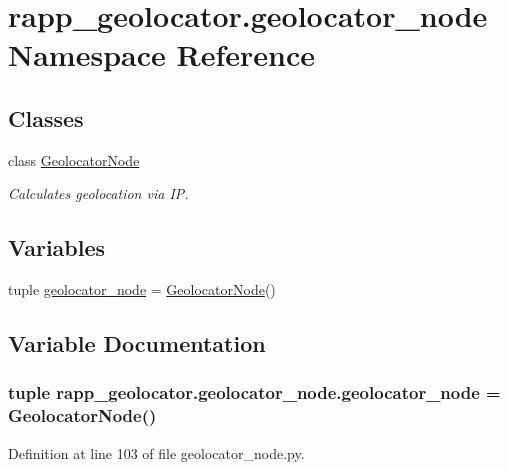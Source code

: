\hypertarget{namespacerapp__geolocator_1_1geolocator__node}{\section{rapp\-\_\-geolocator.\-geolocator\-\_\-node Namespace Reference}
\label{namespacerapp__geolocator_1_1geolocator__node}
}
\subsection*{Classes}
\begin{DoxyCompactItemize}
\item 
class \hyperlink{classrapp__geolocator_1_1geolocator__node_1_1GeolocatorNode}{Geolocator\-Node}
\begin{DoxyCompactList}\small\item\em Calculates geolocation via I\-P. \end{DoxyCompactList}\end{DoxyCompactItemize}
\subsection*{Variables}
\begin{DoxyCompactItemize}
\item 
tuple \hyperlink{namespacerapp__geolocator_1_1geolocator__node_ae89aecb0113a4b7e0bdcaf582f54b0fc}{geolocator\-\_\-node} = \hyperlink{classrapp__geolocator_1_1geolocator__node_1_1GeolocatorNode}{Geolocator\-Node}()
\end{DoxyCompactItemize}


\subsection{Variable Documentation}
\hypertarget{namespacerapp__geolocator_1_1geolocator__node_ae89aecb0113a4b7e0bdcaf582f54b0fc}{
\subsubsection[{geolocator\-\_\-node}]{\setlength{\rightskip}{0pt plus 5cm}tuple rapp\-\_\-geolocator.\-geolocator\-\_\-node.\-geolocator\-\_\-node = {\bf Geolocator\-Node}()}}\label{namespacerapp__geolocator_1_1geolocator__node_ae89aecb0113a4b7e0bdcaf582f54b0fc}


Definition at line 103 of file geolocator\-\_\-node.\-py.

